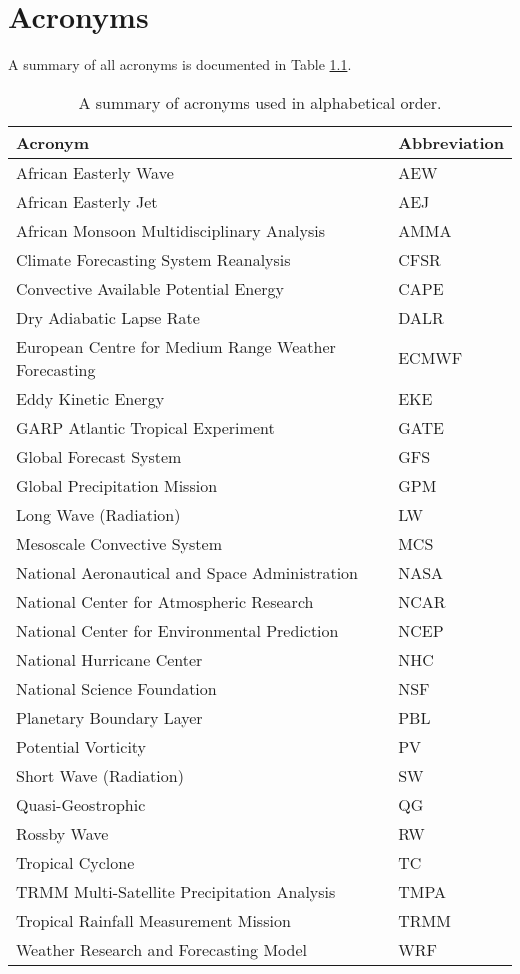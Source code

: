\chapter{Acronyms}

A summary of all acronyms is documented in Table \ref{tab:acro}.

\begin{longtable}{| l | l |}
\caption{A summary of acronyms used in alphabetical order.}\label{tab:acro}\\
\hline
Acronym & Abbreviation \\
\hline
African Easterly Wave & AEW \\
African Easterly Jet & AEJ \\
African Monsoon Multidisciplinary Analysis & AMMA \\
Climate Forecasting System Reanalysis & CFSR \\
Convective Available Potential Energy & CAPE \\
Dry Adiabatic Lapse Rate & DALR \\
European Centre for Medium Range Weather Forecasting & ECMWF \\
Eddy Kinetic Energy & EKE \\
GARP Atlantic Tropical Experiment & GATE \\
Global Forecast System & GFS \\
Global Precipitation Mission & GPM \\
Long Wave (Radiation) & LW \\
Mesoscale Convective System & MCS \\
National Aeronautical and Space Administration & NASA \\
National Center for Atmospheric Research & NCAR \\
National Center for Environmental Prediction & NCEP \\
National Hurricane Center & NHC \\
National Science Foundation & NSF \\
Planetary Boundary Layer & PBL \\
Potential Vorticity & PV \\
Short Wave (Radiation) & SW \\ 
Quasi-Geostrophic & QG \\
Rossby Wave & RW \\
Tropical Cyclone & TC \\
TRMM Multi-Satellite Precipitation Analysis & TMPA \\
Tropical Rainfall Measurement Mission & TRMM \\
Weather Research and Forecasting Model & WRF \\
\hline
\end{longtable}


